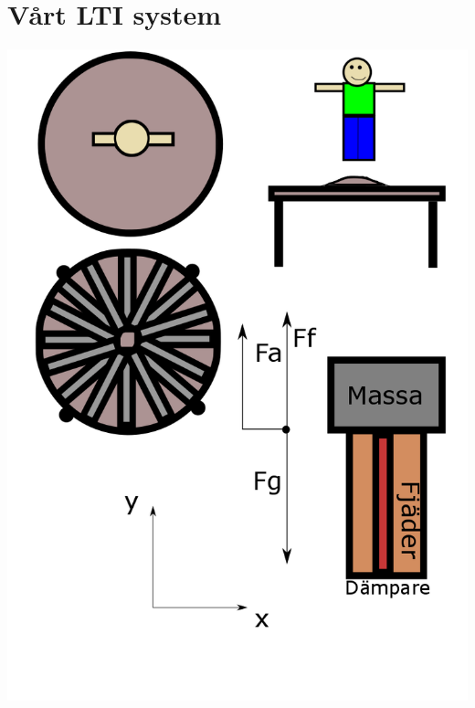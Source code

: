 \documentclass[10pt,a4paper]{article}
\begin{document}
\section{Vårt LTI system}

\includegraphics[scale=0.2]{Bild}
\end{document}
